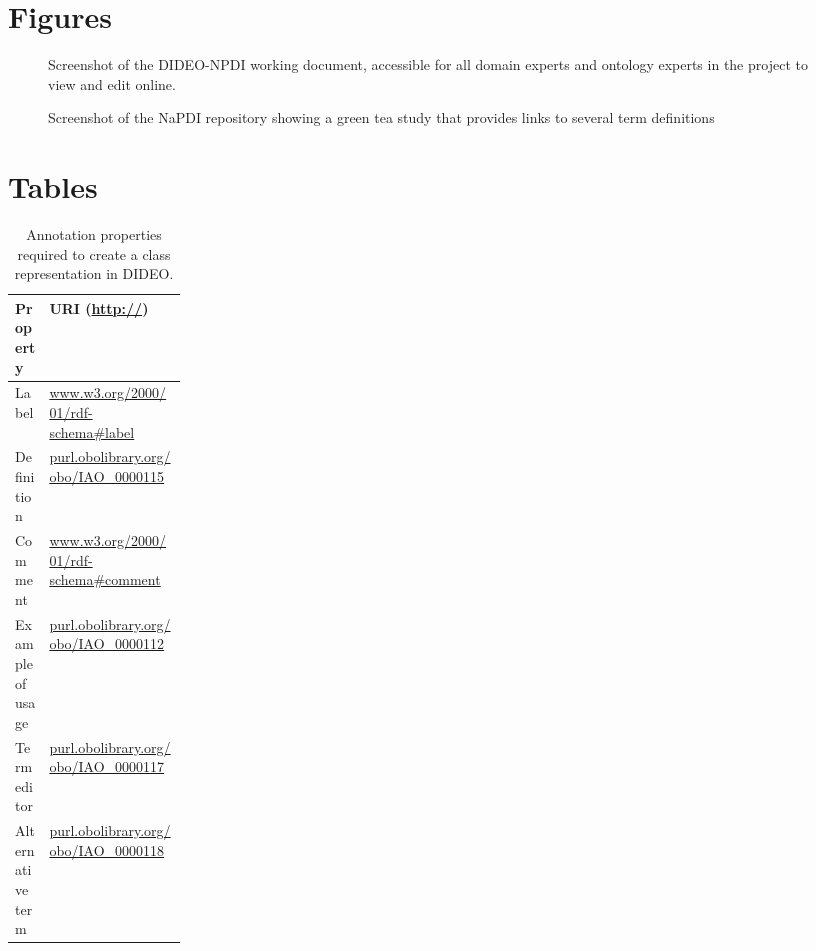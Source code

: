 \documentclass{bmcart}
\def\texttt{[image: ]}
\begin{document}
\begin{backmatter}


\section*{Figures}

\begin{figure}[!h]
    \centering
    \caption{Screenshot of the DIDEO-NPDI working document, accessible for all domain experts and ontology experts in the project to view and edit online.}
    \label{napdi_screenshot}
\end{figure}

\begin{figure}[!h]
    \centering
    \caption{Screenshot of the NaPDI repository showing a green tea study that provides links to several term definitions}
    \label{napdi_study}
\end{figure}


\section*{Tables}
\begin{table}[h!]
\caption{Annotation properties required to create a class representation in DIDEO. \label{Tab:01}}
{\begin{tabular}{|p{0.2\linewidth}|l|} \hline
        \textbf{Property} &
        \textbf{URI (\url{http://})}\\ \hline
    Label & \url{www.w3.org/2000/01/rdf-schema#label} \\ \hline
    Definition & \url{purl.obolibrary.org/obo/IAO_0000115} \\ \hline
    Comment & \url{www.w3.org/2000/01/rdf-schema#comment} \\ \hline
    \multicolumn{1}{|l|}{Example of usage} & \url{purl.obolibrary.org/obo/IAO_0000112} \\ \hline
    Term editor & \url{purl.obolibrary.org/obo/IAO_0000117} \\ \hline
    Alternative term & \url{purl.obolibrary.org/obo/IAO_0000118} \\ \hline
    \end{tabular}}
    \label{annotation_properties}
\end{table}


\end{backmatter}
\end{document}
